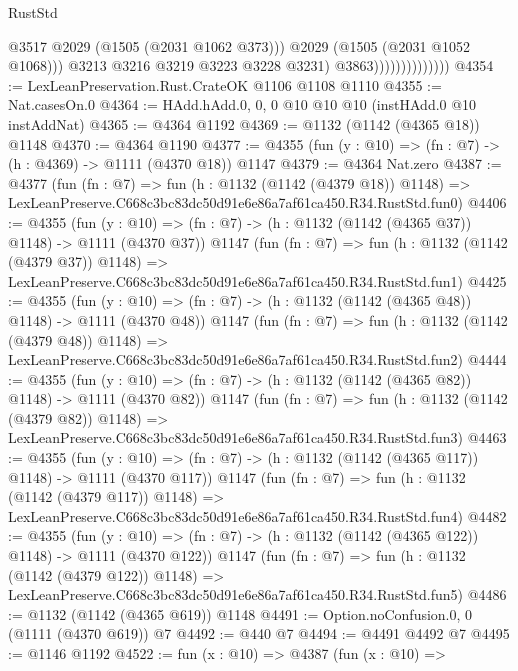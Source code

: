 \begin{lexlean}{RustStd}
\begin{coremodule}
                                      @3517
                                      @2029
                                      (@1505 (@2031 @1062 @373)))
                                    @2029
                                    (@1505 (@2031 @1052 @1068)))
                                  @3213
                                  @3216
                                  @3219
                                  @3223
                                  @3228
                                  @3231)
                                @3863))))))))))))))
@4354 := LexLeanPreservation.Rust.CrateOK @1106 @1108 @1110
@4355 := Nat.casesOn.{0}
@4364 := HAdd.hAdd.{0, 0, 0} @10 @10 @10 (instHAdd.{0} @10 instAddNat)
@4365 := @4364 @1192
@4369 := @1132 (@1142 (@4365 @18)) @1148
@4370 := @4364 @1190
@4377 := @4355 (fun (y : @10) => (fn : @7) -> (h : @4369) -> @1111 (@4370 @18)) @1147
@4379 := @4364 Nat.zero
@4387 := @4377
    (fun (fn : @7) =>
    fun (h : @1132 (@1142 (@4379 @18)) @1148) =>
    LexLeanPreserve.C668c3bc83dc50d91e6e86a7af61ca450.R34.RustStd.fun0)
@4406 := @4355
    (fun (y : @10) => (fn : @7) -> (h : @1132 (@1142 (@4365 @37)) @1148) -> @1111 (@4370 @37))
    @1147
    (fun (fn : @7) =>
    fun (h : @1132 (@1142 (@4379 @37)) @1148) =>
    LexLeanPreserve.C668c3bc83dc50d91e6e86a7af61ca450.R34.RustStd.fun1)
@4425 := @4355
    (fun (y : @10) => (fn : @7) -> (h : @1132 (@1142 (@4365 @48)) @1148) -> @1111 (@4370 @48))
    @1147
    (fun (fn : @7) =>
    fun (h : @1132 (@1142 (@4379 @48)) @1148) =>
    LexLeanPreserve.C668c3bc83dc50d91e6e86a7af61ca450.R34.RustStd.fun2)
@4444 := @4355
    (fun (y : @10) => (fn : @7) -> (h : @1132 (@1142 (@4365 @82)) @1148) -> @1111 (@4370 @82))
    @1147
    (fun (fn : @7) =>
    fun (h : @1132 (@1142 (@4379 @82)) @1148) =>
    LexLeanPreserve.C668c3bc83dc50d91e6e86a7af61ca450.R34.RustStd.fun3)
@4463 := @4355
    (fun (y : @10) => (fn : @7) -> (h : @1132 (@1142 (@4365 @117)) @1148) -> @1111 (@4370 @117))
    @1147
    (fun (fn : @7) =>
    fun (h : @1132 (@1142 (@4379 @117)) @1148) =>
    LexLeanPreserve.C668c3bc83dc50d91e6e86a7af61ca450.R34.RustStd.fun4)
@4482 := @4355
    (fun (y : @10) => (fn : @7) -> (h : @1132 (@1142 (@4365 @122)) @1148) -> @1111 (@4370 @122))
    @1147
    (fun (fn : @7) =>
    fun (h : @1132 (@1142 (@4379 @122)) @1148) =>
    LexLeanPreserve.C668c3bc83dc50d91e6e86a7af61ca450.R34.RustStd.fun5)
@4486 := @1132 (@1142 (@4365 @619)) @1148
@4491 := Option.noConfusion.{0, 0} (@1111 (@4370 @619)) @7
@4492 := @440 @7
@4494 := @4491 @4492 @7
@4495 := @1146 @1192
@4522 := fun (x : @10) =>
  @4387
    (fun (x : @10) =>

\end{coremodule}
\end{lexlean}

